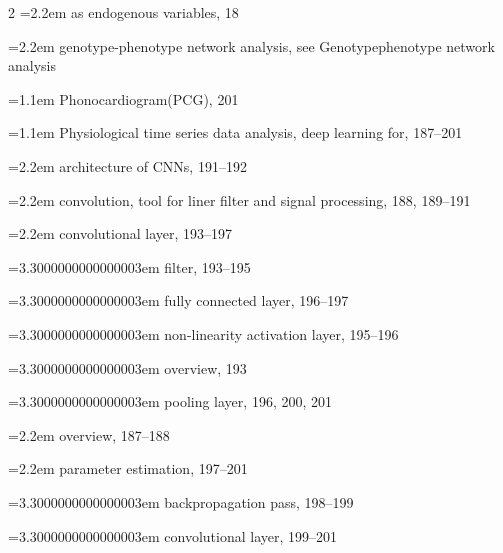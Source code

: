 \begin{multicols}{2}
\noindent\hangindent=2.2em \hspace*{1.1em}as endogenous variables, 18\par
\noindent\hangindent=2.2em \hspace*{1.1em}genotype-phenotype network analysis, see Genotypephenotype network analysis\par
\noindent\hangindent=1.1em Phonocardiogram(PCG), 201\par
\noindent\hangindent=1.1em Physiological time series data analysis, deep learning for, 187--201\par
\noindent\hangindent=2.2em \hspace*{1.1em}architecture of CNNs, 191--192\par
\noindent\hangindent=2.2em \hspace*{1.1em}convolution, tool for liner filter and signal processing, 188, 189--191\par
\noindent\hangindent=2.2em \hspace*{1.1em}convolutional layer, 193--197\par
\noindent\hangindent=3.3000000000000003em \hspace*{2.2em}filter, 193--195\par
\noindent\hangindent=3.3000000000000003em \hspace*{2.2em}fully connected layer, 196--197\par
\noindent\hangindent=3.3000000000000003em \hspace*{2.2em}non-linearity activation layer, 195--196\par
\noindent\hangindent=3.3000000000000003em \hspace*{2.2em}overview, 193\par
\noindent\hangindent=3.3000000000000003em \hspace*{2.2em}pooling layer, 196, 200, 201\par
\noindent\hangindent=2.2em \hspace*{1.1em}overview, 187--188\par
\noindent\hangindent=2.2em \hspace*{1.1em}parameter estimation, 197--201\par
\noindent\hangindent=3.3000000000000003em \hspace*{2.2em}backpropagation pass, 198--199\par
\noindent\hangindent=3.3000000000000003em \hspace*{2.2em}convolutional layer, 199--201\par

\end{multicols}
